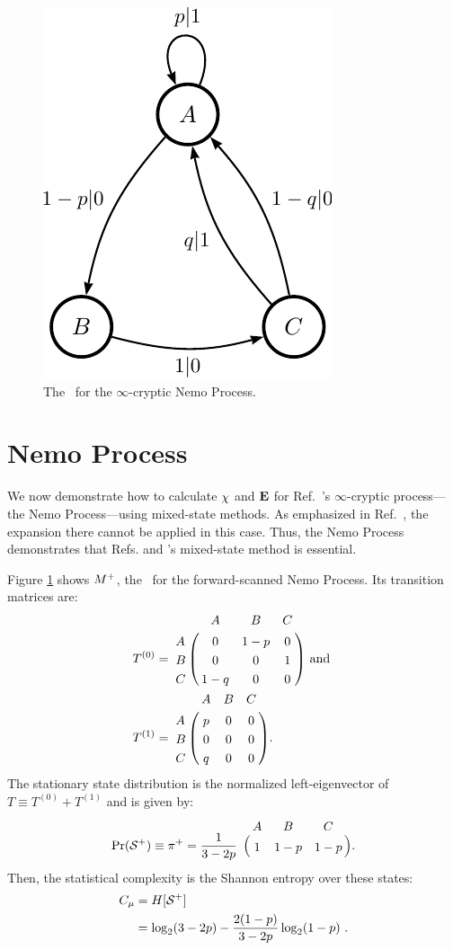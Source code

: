 \begin{figure}[th]
\begin{center}
\includegraphics{../chapter4/figures/nemo_feM_gr}
\caption{The \eM\ for the $\infty$-cryptic Nemo Process.}
\label{fig:Nemo}
\end{center}
\end{figure}

\section{Nemo Process}

We now demonstrate how to calculate $\chi$ and ${\bf E}$ for Ref.~\cite{Maho09a}'s
$\infty$-cryptic process---the Nemo Process---using mixed-state methods. As
emphasized in Ref.~\cite{Maho09a}, the  expansion there cannot be
applied in this case. Thus, the Nemo Process demonstrates that
Refs. \cite{Crut08a} and \cite{Crut08b}'s mixed-state method is essential.

Figure \ref{fig:Nemo} shows ${M}^{+}$, the \eM\ for the forward-scanned
Nemo Process. Its transition matrices are:
\begin{align*}
T^{(0)} &= 
\bordermatrix{%
  & A & B & C \cr
A & 0 & 1-p & 0 \cr
B & 0 & 0 & 1 \cr
C & 1-q & 0 & 0
} \textrm{ and }\\
T^{(1)} &=
\bordermatrix{%
  & A & B & C \cr
A & p & 0 & 0 \cr
B & 0 & 0 & 0 \cr
C & q & 0 & 0
}.
\end{align*}
The stationary state distribution is the normalized left-eigenvector of 
$T \equiv T^{(0)} + T^{(1)}$ and is given by:
\begin{align*}
\Pr(\FutureCausalState) \equiv \pi^+ = \frac{1}{3-2p}
\bordermatrix{%
 & A & B & C \cr
 & 1 & 1-p & 1-p
}.
\end{align*}
Then, the statistical complexity is the Shannon entropy over these states:
\begin{align*}
C_\mu &= H[{\mathcal{S}}^{+}]  \\
           & = \log_2(3-2p) - \frac{2(1-p)}{3-2p} \log_2 (1-p) ~.
\end{align*}

